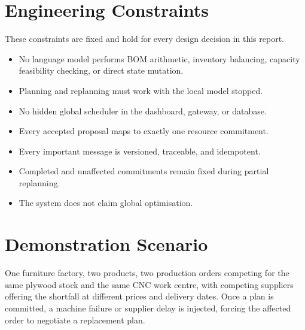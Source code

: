 
\section{Engineering Constraints}

These constraints are fixed and hold for every design decision in this report.

\begin{itemize}[nosep]
  \item No language model performs BOM arithmetic, inventory balancing,
        capacity feasibility checking, or direct state mutation.
  \item Planning and replanning must work with the local model stopped.
  \item No hidden global scheduler in the dashboard, gateway, or database.
  \item Every accepted proposal maps to exactly one resource commitment.
  \item Every important message is versioned, traceable, and idempotent.
  \item Completed and unaffected commitments remain fixed during partial
        replanning.
  \item The system does not claim global optimisation.
\end{itemize}

\section{Demonstration Scenario}

One furniture factory, two products, two production orders competing for the
same plywood stock and the same CNC work centre, with competing suppliers
offering the shortfall at different prices and delivery dates. Once a plan is
committed, a machine failure or supplier delay is injected, forcing the
affected order to negotiate a replacement plan.

